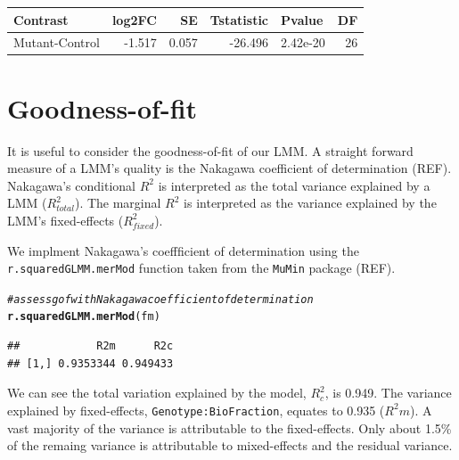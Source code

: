 \documentclass[11pt]{elife}\usepackage[]{graphicx}\usepackage[]{color}
\makeatletter
\newcommand{\hlcom}[1]{\textcolor[rgb]{0.678,0.584,0.686}{\textit{#1}}}%
\newcommand{\hlstd}[1]{\textcolor[rgb]{0.345,0.345,0.345}{#1}}%
\newcommand{\hlkwd}[1]{\textcolor[rgb]{0.737,0.353,0.396}{\textbf{#1}}}%
\newenvironment{kframe}{%
 \def\at@end@of@kframe{}%
 \ifinner\ifhmode%
  \def\at@end@of@kframe{\end{minipage}}%
  \begin{minipage}{\columnwidth}%
 \fi\fi%
 \def\FrameCommand##1{\hskip\@totalleftmargin \hskip-\fboxsep
 \colorbox{shadecolor}{##1}\hskip-\fboxsep
     \hskip-\linewidth \hskip-\@totalleftmargin \hskip\columnwidth}%
 \MakeFramed {\advance\hsize-\width
   \@totalleftmargin\z@ \linewidth\hsize
   \@setminipage}}%
 {\par\unskip\endMakeFramed%
 \at@end@of@kframe}
\newenvironment{knitrout}{}{} %
\makeatother
\begin{document}
\begin{knitrout}
\color{fgcolor}
\begin{tabular}{l|r|r|r|l|r}
\hline
Contrast & log2FC & SE & Tstatistic & Pvalue & DF\\
\hline
Mutant-Control & -1.517 & 0.057 & -26.496 & 2.42e-20 & 26\\
\hline
\end{tabular}


\end{knitrout}


\section{Goodness-of-fit}

It is useful to consider the goodness-of-fit of our LMM. A straight forward
measure of a LMM's quality is the Nakagawa coefficient of 
determination (REF). Nakagawa's conditional $R^2$ is interpreted as 
the total variance explained by a LMM ($R^2_{total}$).
The marginal $R^2$ is interpreted as the variance explained by the LMM's 
fixed-effects ($R^2_{fixed}$).

We implment Nakagawa's coeffficient of determination using the 
\texttt{r.squaredGLMM.merMod} function taken from the \texttt{MuMin}
package (REF).\\


\begin{knitrout}
\color{fgcolor}\begin{kframe}
\begin{alltt}
\hlcom{# assess gof with Nakagawa coefficient of determination}
\hlkwd{r.squaredGLMM.merMod}\hlstd{(fm)}
\end{alltt}
\begin{verbatim}
##            R2m      R2c
## [1,] 0.9353344 0.949433
\end{verbatim}
\end{kframe}
\end{knitrout}

We can see the total variation explained by the model, $R^2_{c}$, is 0.949. 
The variance explained by fixed-effects, \texttt{Genotype:BioFraction},
equates to 0.935 ($R^2{m}$). A vast majority of the variance is attributable to 
the fixed-effects. Only about 1.5\% of the remaing variance is attributable to 
mixed-effects and the residual variance.\\
\end{document}
